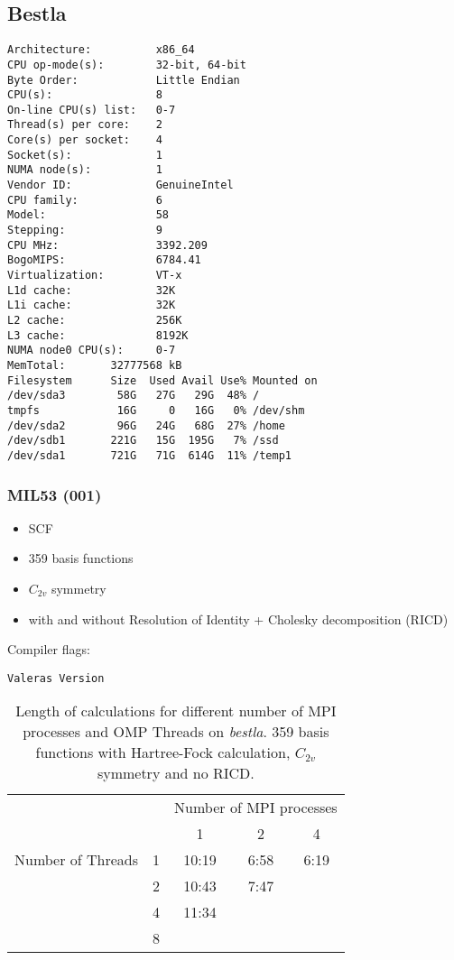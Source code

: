 \documentclass[12pt,a4paper,bibliography=totocnumbered,listof=totocnumbered]{scrartcl}
\begin{document}
\subsection{Bestla}
\begin{verbatim}
Architecture:          x86_64
CPU op-mode(s):        32-bit, 64-bit
Byte Order:            Little Endian
CPU(s):                8
On-line CPU(s) list:   0-7 
Thread(s) per core:    2   
Core(s) per socket:    4   
Socket(s):             1
NUMA node(s):          1
Vendor ID:             GenuineIntel
CPU family:            6
Model:                 58
Stepping:              9
CPU MHz:               3392.209
BogoMIPS:              6784.41
Virtualization:        VT-x
L1d cache:             32K
L1i cache:             32K
L2 cache:              256K
L3 cache:              8192K
NUMA node0 CPU(s):     0-7 
MemTotal:       32777568 kB
Filesystem      Size  Used Avail Use% Mounted on
/dev/sda3        58G   27G   29G  48% /
tmpfs            16G     0   16G   0% /dev/shm
/dev/sda2        96G   24G   68G  27% /home
/dev/sdb1       221G   15G  195G   7% /ssd
/dev/sda1       721G   71G  614G  11% /temp1
\end{verbatim}

\subsubsection{MIL53 (001)}
\begin{itemize}
    \item SCF
    \item 359 basis functions
    \item $C_{2v}$ symmetry
    \item with and without Resolution of Identity + Cholesky decomposition (RICD)
\end{itemize}

Compiler flags:
\begin{verbatim}
Valeras Version
\end{verbatim}

\begin{table}[H]
    \caption{Length of calculations for different number of MPI processes and OMP Threads on \emph{bestla}. 359 basis functions with Hartree-Fock calculation, $C_{2v}$ symmetry and no RICD.}
    \label{T:duration}
    \begin{tabular}{ccccc}
        \toprule
        &     & \multicolumn{3}{c}{Number of MPI processes} \\
        \cmidrule{3-5}
        &         &    1     &     2     &    4     \\ 
        \midrule
        Number of Threads    &   1           &  10:19   &   6:58     &     6:19\\ 
                             &   2           &  10:43   &   7:47     &         \\ 
                             &   4           &  11:34   &            &         \\ 
                             &   8           &          &            &         \\ 
        \bottomrule
    \end{tabular}
\end{table}
\end{document}
